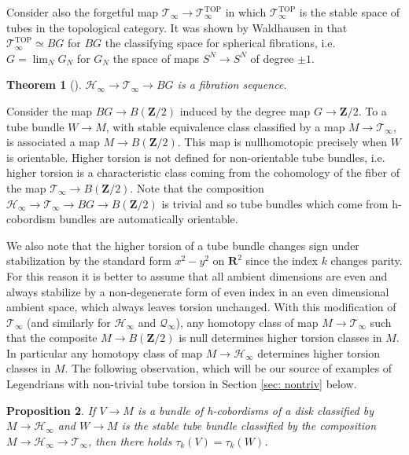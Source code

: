 \documentclass{amsart}
\newcommand\cH{\mathcal{H}}
\newcommand\cQ{\mathcal{Q}}
\newcommand\cT{\mathcal{T}}
\def\bR{\mathbf{R}}
\def\bZ{\mathbf{Z}}
\newtheorem{theorem}{Theorem}[section]
\newtheorem{proposition}[theorem]{Proposition}
\theoremstyle{definition}
\theoremstyle{remark}
\newtheorem{inductive lemma}[theorem]{Inductive Lemma}
\begin{document}
Consider also the forgetful map $\cT_\infty \to \cT_\infty^{\text{TOP}}$ in which $ \cT_\infty^{\text{TOP}}$ is the stable space of tubes in the topological category. It was shown by Waldhausen in \cite{W82} that $\cT_\infty^{\text{TOP}} \simeq BG$ for $BG$ the classifying space for spherical fibrations, i.e. $G=\lim_N G_N$ for $G_N$ the space of maps $S^N \to S^N$ of degree $\pm 1$. 



\begin{theorem}[\cite{W82}]\label{thm: wald fib} $\cH_\infty \to \cT_\infty \to BG$ is a fibration sequence. \end{theorem}

Consider the map $BG \to B (\bZ/2)$ induced by the degree map $G \to \bZ/2$. To a tube bundle $W \to M$, with stable equivalence class classified by a map $M \to \cT_\infty$, is associated a map $M \to B (\bZ/2)$. This map is nullhomotopic precisely when $W$ is orientable. Higher torsion is not defined for non-orientable tube bundles, i.e. higher torsion is a characteristic class coming from the cohomology of the fiber of the map $\cT_\infty \to B(\bZ/2)$. Note that the composition $\cH_\infty \to \cT_\infty \to BG \to B(\bZ/2)$ is trivial and so tube bundles which come from h-cobordism bundles are automatically orientable. 

We also note that the higher torsion of a tube bundle changes sign under stabilization by the standard form $x^2-y^2$ on $\bR^2$ since the index $k$ changes parity. For this reason it is better to assume that all ambient dimensions are even and always stabilize by a non-degenerate form of even index in an even dimensional ambient space, which always leaves torsion unchanged. With this modification of $\cT_\infty$ (and similarly for $\cH_\infty$ and $\cQ_\infty$), any homotopy class of map $M \to \cT_\infty$ such that the composite $M \to B(\bZ/2)$ is null determines higher torsion classes in $M$. In particular any homotopy class of map $M \to \cH_\infty$ determines higher torsion classes  in $M$. The following observation, which will be our source of examples of Legendrians with non-trivial tube torsion in Section \ref{sec: nontriv} below. 

\begin{proposition} If $V \to M$ is a bundle of h-cobordisms of a disk classified by $M \to \cH_\infty$ and $W \to M$ is the stable tube bundle classified by the composition $M \to \cH_\infty \to  \cT_\infty$, then there holds $\tau_k(V)=\tau_k(W)$.  \end{proposition}
\end{document}
